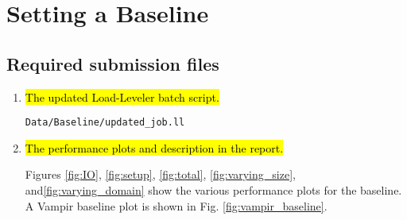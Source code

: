 \section{Setting a Baseline}
\subsection{Required submission files}
\begin{enumerate}
	\item \hl{The updated Load-Leveler batch script.}

		\verb!Data/Baseline/updated_job.ll!

	\item \hl{The performance plots and description in the report.}

		Figures \ref{fig:IO}, \ref{fig:setup}, \ref{fig:total}, \ref{fig:varying_size}, and\ref{fig:varying_domain} show the various performance plots for the baseline. A Vampir baseline plot is shown in Fig. \ref{fig:vampir_baseline}.

\end{enumerate}


